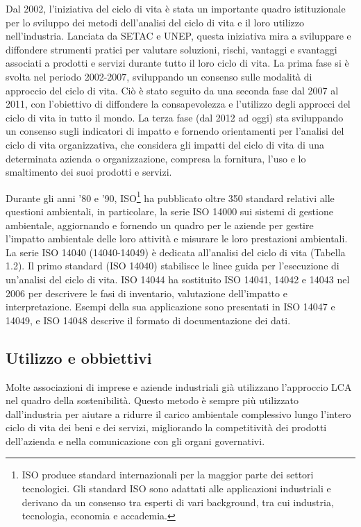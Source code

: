 Dal 2002, l'iniziativa del ciclo di vita è stata un importante quadro istituzionale per lo sviluppo dei metodi dell'analisi del ciclo di vita e il loro utilizzo nell'industria. Lanciata da SETAC e UNEP, questa iniziativa mira a sviluppare e diffondere strumenti pratici per valutare soluzioni, rischi, vantaggi e svantaggi associati a prodotti e servizi durante tutto il loro ciclo di vita. La prima fase si è svolta nel periodo 2002-2007, sviluppando un consenso sulle modalità di approccio del ciclo di vita. Ciò è stato seguito da una seconda fase dal 2007 al 2011, con l'obiettivo di diffondere la consapevolezza e l'utilizzo degli approcci del ciclo di vita in tutto il mondo. La terza fase (dal 2012 ad oggi) sta sviluppando un consenso sugli indicatori di impatto e fornendo orientamenti per l'analisi del ciclo di vita organizzativa, che considera gli impatti del ciclo di vita di una determinata azienda o organizzazione, compresa la fornitura, l'uso e lo smaltimento dei suoi prodotti e servizi.

Durante gli anni '80 e '90, ISO\footnote{ISO produce standard internazionali per la maggior parte dei settori tecnologici. Gli standard ISO sono adattati alle applicazioni industriali e derivano da un consenso tra esperti di vari background, tra cui industria, tecnologia, economia e accademia.} ha pubblicato oltre 350 standard relativi alle questioni ambientali, in particolare, la serie ISO 14000 sui sistemi di gestione ambientale, aggiornando e fornendo un quadro per le aziende per gestire l'impatto ambientale delle loro attività e misurare le loro prestazioni ambientali. La serie ISO 14040 (14040-14049) è dedicata all'analisi del ciclo di vita (Tabella 1.2). Il primo standard (ISO 14040) stabilisce le linee guida per l'esecuzione di un'analisi del ciclo di vita. ISO 14044 ha sostituito ISO 14041, 14042 e 14043 nel 2006 per descrivere le fasi di inventario, valutazione dell'impatto e interpretazione. Esempi della sua applicazione sono presentati in ISO 14047 e 14049, e ISO 14048 descrive il formato di documentazione dei dati.

\subsection{Utilizzo e obbiettivi}
Molte associazioni di imprese e aziende industriali già utilizzano l'approccio LCA nel quadro della sostenibilità. Questo metodo è sempre più utilizzato dall'industria per aiutare a ridurre il carico ambientale complessivo lungo l'intero ciclo di vita dei beni e dei servizi, migliorando la competitività dei prodotti dell'azienda e nella comunicazione con gli organi governativi.

